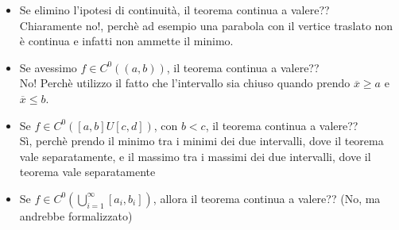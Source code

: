 \documentclass{article}
\theoremstyle{definition}
\begin{document}
\begin{itemize}
    \item Se elimino l'ipotesi di continuità, il teorema continua a valere??
    \\
    Chiaramente no!, perchè ad esempio una parabola con il vertice traslato non è continua e infatti non ammette il minimo.
    \item Se avessimo $f \in C^0((a,b))$, il teorema continua a valere??
    \\
    No! Perchè utilizzo il fatto che l'intervallo sia chiuso quando prendo $\overline{x} \geqslant a$ e $\overline{x} \leqslant b$.
    \item Se $f \in C^0([a,b] U [c,d])$, con $b <c$, il teorema continua a valere??
    \\
    Sì, perchè prendo il minimo tra i minimi dei due intervalli, dove il teorema vale separatamente, e il massimo tra i massimi dei due intervalli, dove il teorema vale separatamente
    \item Se $f \in C^0(\bigcup_{i=1}^{\infty}[a_i,b_i])$, allora il teorema continua a valere?? (No, ma andrebbe formalizzato)
\end{itemize}
\end{document}

